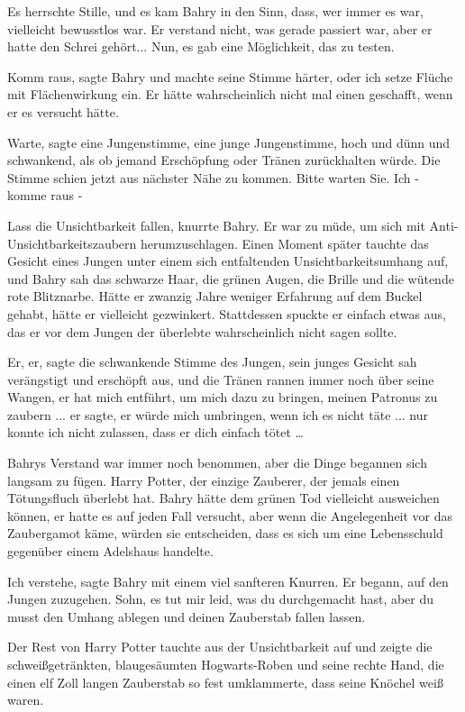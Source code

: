 Es herrschte Stille, und es kam Bahry in den Sinn, dass, wer immer es war,
vielleicht bewusstlos war. Er verstand nicht, was gerade passiert war, aber er
hatte den Schrei gehört... Nun, es gab eine Möglichkeit, das zu testen.

\glqq{}Komm raus\grqq{}, sagte Bahry und machte seine Stimme härter, \glqq{}oder
ich setze Flüche mit Flächenwirkung ein.\grqq{} Er hätte wahrscheinlich nicht
mal einen geschafft, wenn er es versucht hätte.

\glqq{}Warte\grqq{}, sagte eine Jungenstimme, eine junge Jungenstimme, hoch und
dünn und schwankend, als ob jemand Erschöpfung oder Tränen zurückhalten würde.
Die Stimme schien jetzt aus nächster Nähe zu kommen. \glqq{}Bitte warten Sie. Ich
- komme raus -\grqq{}

\glqq{}Lass die Unsichtbarkeit fallen\grqq{}, knurrte Bahry. Er war zu müde, um
sich mit Anti-Unsichtbarkeitszaubern herumzuschlagen. Einen Moment später
tauchte das Gesicht eines Jungen unter einem sich entfaltenden
Unsichtbarkeitsumhang auf, und Bahry sah das schwarze Haar, die grünen Augen,
die Brille und die wütende rote Blitznarbe. Hätte er zwanzig Jahre weniger
Erfahrung auf dem Buckel gehabt, hätte er vielleicht gezwinkert. Stattdessen
spuckte er einfach etwas aus, das er vor dem Jungen der überlebte wahrscheinlich
nicht sagen sollte.

\glqq{}Er, er\grqq{}, sagte die schwankende Stimme des Jungen, sein junges
Gesicht sah verängstigt und erschöpft aus, und die Tränen rannen immer noch über
seine Wangen, \glqq{}er hat mich entführt, um mich dazu zu bringen, meinen
Patronus zu zaubern ... er sagte, er würde mich umbringen, wenn ich es nicht
täte ... nur konnte ich nicht zulassen, dass er dich einfach tötet …\grqq{}

Bahrys Verstand war immer noch benommen, aber die Dinge begannen sich langsam zu
fügen. Harry Potter, der einzige Zauberer, der jemals einen Tötungsfluch
überlebt hat. Bahry hätte dem grünen Tod vielleicht ausweichen können, er hatte
es auf jeden Fall versucht, aber wenn die Angelegenheit vor das Zaubergamot
käme, würden sie entscheiden, dass es sich um eine Lebensschuld gegenüber einem
Adelshaus handelte.

\glqq{}Ich verstehe\grqq{}, sagte Bahry mit einem viel sanfteren Knurren. Er
begann, auf den Jungen zuzugehen. \glqq{}Sohn, es tut mir leid, was du
durchgemacht hast, aber du musst den Umhang ablegen und deinen Zauberstab fallen
lassen.\grqq{}

Der Rest von Harry Potter tauchte aus der Unsichtbarkeit auf und zeigte die
schweißgetränkten, blaugesäumten Hogwarts-Roben und seine rechte Hand, die einen
elf Zoll langen Zauberstab so fest umklammerte, dass seine Knöchel weiß waren.

